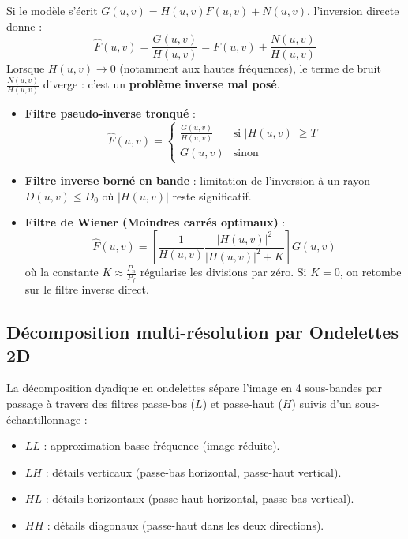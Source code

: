 Si le modèle s'écrit $G(u,v) = H(u,v) F(u,v) + N(u,v)$, l'inversion directe donne :
$$ \hat{F}(u,v) = \frac{G(u,v)}{H(u,v)} = F(u,v) + \frac{N(u,v)}{H(u,v)} $$
Lorsque $H(u,v) \to 0$ (notamment aux hautes fréquences), le terme de bruit $\frac{N(u,v)}{H(u,v)}$ diverge : c'est un \textbf{problème inverse mal posé}.

\begin{proposition}
    \begin{itemize}
        \item \textbf{Filtre pseudo-inverse tronqué} :
            \begin{equation}
                \hat{F}(u,v) = \begin{cases} \displaystyle \frac{G(u,v)}{H(u,v)} & \text{si } |H(u,v)| \geqslant T \\ G(u,v) & \text{sinon} \end{cases}
            \end{equation}
        \item \textbf{Filtre inverse borné en bande} : limitation de l'inversion à un rayon $D(u,v) \leqslant D_0$ où $|H(u,v)|$ reste significatif.
        \item \textbf{Filtre de Wiener (Moindres carrés optimaux)} :
            \begin{equation}
                \boxed{\hat{F}(u,v) = \left[ \frac{1}{H(u,v)} \frac{|H(u,v)|^2}{|H(u,v)|^2 + K} \right] G(u,v)}
            \end{equation}
            où la constante $K \approx \frac{P_n}{P_f}$ régularise les divisions par zéro. Si $K = 0$, on retombe sur le filtre inverse direct.
    \end{itemize}
\end{proposition}

\subsection{Décomposition multi-résolution par Ondelettes 2D}

La décomposition dyadique en ondelettes sépare l'image en 4 sous-bandes par passage à travers des filtres passe-bas ($L$) et passe-haut ($H$) suivis d'un sous-échantillonnage :
\begin{itemize}
    \item $LL$ : approximation basse fréquence (image réduite).
    \item $LH$ : détails verticaux (passe-bas horizontal, passe-haut vertical).
    \item $HL$ : détails horizontaux (passe-haut horizontal, passe-bas vertical).
    \item $HH$ : détails diagonaux (passe-haut dans les deux directions).
\end{itemize}

